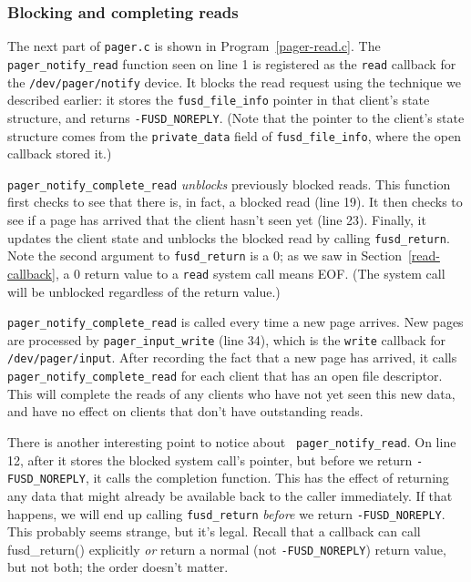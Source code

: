 \documentclass{article}
\begin{document}
\subsubsection{Blocking and completing reads}

The next part of {\tt pager.c} is shown in Program~\ref{pager-read.c}.
The {\tt pager\_notify\_read} function seen on line 1 is registered as
the {\tt read} callback for the {\tt /dev/pager/notify} device.  It
blocks the read request using the technique we described earlier: it
stores the {\tt fusd\_file\_info} pointer in that client's state
structure, and returns {\tt -FUSD\_NOREPLY}.  (Note that the pointer
to the client's state structure comes from the {\tt private\_data}
field of {\tt fusd\_file\_info}, where the open callback stored it.)

\begin{Program}
\caption{pager.c (Part 2): Block clients' {\tt read} requests, and later
completing the blocked reads}
\label{pager-read.c}
\end{Program}


{\tt pager\_notify\_complete\_read} {\em unblocks} previously blocked
reads.  This function first checks to see that there is, in fact, a blocked
read (line 19).  It then checks to see if a page has arrived that the
client hasn't seen yet (line 23).  Finally, it updates the client
state and unblocks the blocked read by calling {\tt fusd\_return}.
Note the second argument to {\tt fusd\_return} is a 0; as we
saw in Section~\ref{read-callback}, a 0 return value to a {\tt read}
system call means EOF.  (The system call will be unblocked regardless
of the return value.)

{\tt pager\_notify\_complete\_read} is called every time a new page
arrives.  New pages are processed by {\tt pager\_input\_write} (line
34), which is the {\tt write} callback for {\tt /dev/pager/input}.
After recording the fact that a new page has arrived, it calls {\tt
pager\_notify\_complete\_read} for each client that has an open file
descriptor.  This will complete the reads of any clients who have not
yet seen this new data, and have no effect on clients that don't have
outstanding reads.

There is another interesting point to notice about {\tt
pager\_notify\_read}.  On line 12, after it stores the blocked system
call's pointer, but before we return {\tt -FUSD\_NOREPLY}, it calls
the completion function.  This has the effect of returning any data
that might already be available back to the caller immediately.  If
that happens, we will end up calling {\tt fusd\_return} {\em before}
we return {\tt -FUSD\_NOREPLY}.  This probably seems strange, but it's
legal.  Recall that a callback can call fusd\_return() explicitly {\em
or} return a normal (not {\tt -FUSD\_NOREPLY}) return value, but not
both; the order doesn't matter.
\end{document}
